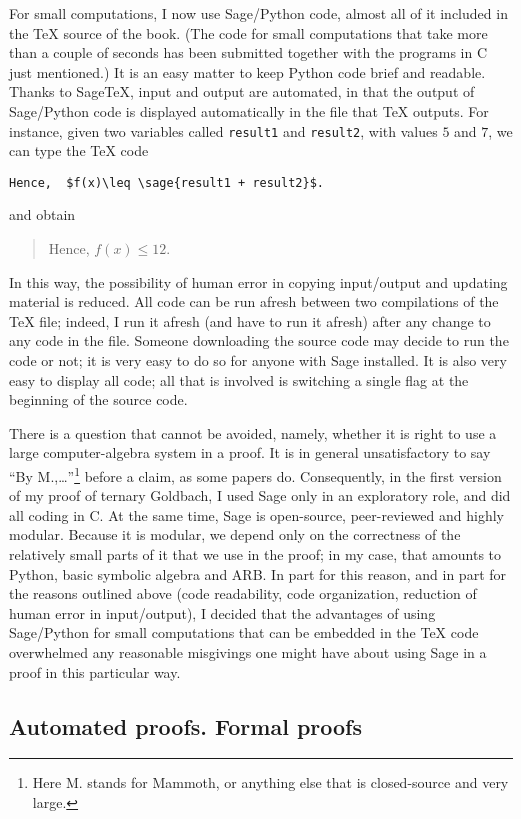 For small computations, I now use Sage/Python code, almost all of it
included in the TeX source of the book. (The code for small computations that
take more than a couple of seconds has been submitted together with the programs
in C just mentioned.) It is an easy matter to keep Python
code brief and readable. Thanks to SageTeX, input and output are automated,
in that the output of Sage/Python code is displayed automatically in the 
file that TeX outputs. For instance, given two variables called \texttt{result1}
and \texttt{result2}, with values $5$ and $7$, we can type the TeX code
\begin{verbatim}
Hence,  $f(x)\leq \sage{result1 + result2}$.
\end{verbatim}
and obtain
\begin{quote}
  Hence, $f(x)\leq 12$.
\end{quote}
In this way, the possibility of human error in copying input/output and
updating material is reduced. All code can be run afresh between two
compilations of the TeX file; indeed, I run it afresh (and have to run it
afresh) after any change to any code in the file. Someone downloading the
source code may decide to run the code or not; it is very easy to do so
for anyone with Sage installed. It is also very easy to display all code;
all that is involved is switching
a single flag at the beginning of the source code.

There is a question that cannot be avoided, namely, whether
it is right to use a large computer-algebra system in a proof. It is in
general unsatisfactory to say ``By M.,\dots''\footnote{Here
  M. stands for Mammoth, or anything else that is closed-source and very large.} before a claim, as some
papers do. Consequently, in the first version of my proof of ternary
Goldbach, I used Sage only in an exploratory role, and did all coding in C.
At the same time, Sage is open-source, peer-reviewed and highly modular.
Because it is modular, we depend only on the correctness of the relatively
small parts of it that we use in the proof; in my case, that amounts to
Python, basic symbolic algebra and ARB.
In part for this reason, and in part for the reasons outlined above
(code readability, code organization,
reduction of human error in input/output),
I decided that the advantages of using Sage/Python for small computations
that can be embedded in the TeX code overwhelmed any reasonable misgivings
one might have about using Sage in a proof in this particular way.

\subsection{Automated proofs. Formal proofs}

